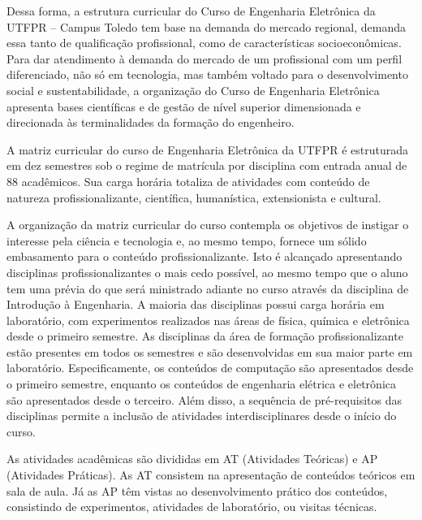 Dessa forma, a estrutura curricular do Curso de Engenharia Eletrônica da UTFPR – Campus Toledo tem base na demanda do mercado regional, demanda essa tanto de qualificação profissional, como de características socioeconômicas. Para dar atendimento à demanda do mercado de um profissional com um perfil diferenciado, não só em tecnologia, mas também voltado para o desenvolvimento social e sustentabilidade, a organização do Curso de Engenharia Eletrônica apresenta bases científicas e de gestão de nível superior dimensionada e direcionada às terminalidades da formação do engenheiro.

A matriz curricular do curso de Engenharia Eletrônica da UTFPR é estruturada em dez semestres sob o regime de matrícula por disciplina com entrada anual de 88 acadêmicos. Sua carga horária totaliza  de atividades com conteúdo de natureza profissionalizante, científica, humanística, extensionista e cultural.

A organização da matriz curricular do curso contempla os objetivos de instigar o interesse pela ciência e tecnologia e, ao mesmo tempo, fornece um sólido embasamento para o conteúdo profissionalizante. Isto é alcançado apresentando disciplinas profissionalizantes o mais cedo possível, ao mesmo tempo que o aluno tem uma prévia do que será ministrado adiante no curso através da disciplina de Introdução à Engenharia. A maioria das disciplinas possui carga horária em laboratório, com experimentos realizados nas áreas de física, química e eletrônica desde o primeiro semestre. As disciplinas da área de formação profissionalizante estão presentes em todos os semestres e são desenvolvidas em sua maior parte em laboratório. Especificamente, os conteúdos de computação são apresentados desde o primeiro semestre, enquanto os conteúdos de engenharia elétrica e eletrônica são apresentados desde o terceiro. Além disso, a sequência de pré-requisitos das disciplinas permite a inclusão de atividades interdisciplinares desde o início do curso.

As atividades acadêmicas são divididas em AT (Atividades Teóricas) e AP (Atividades Práticas). As AT consistem na apresentação de conteúdos teóricos em sala de aula. Já as AP têm vistas ao desenvolvimento prático dos conteúdos, consistindo de experimentos, atividades de laboratório, ou visitas técnicas.




